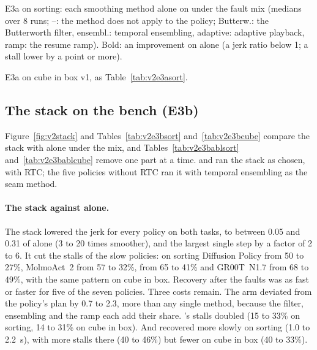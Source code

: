 \begin{table}[htbp]
  \centering
  \small
  \begin{adjustbox}{max width=\textwidth}
  \end{adjustbox}
  \caption{E3a on sorting: each smoothing method alone on \drtc{} under the fault mix (medians over 8 runs; --: the
           method does not apply to the policy; Butterw.: the Butterworth filter, ensembl.: temporal ensembling, adaptive:
           adaptive playback, ramp: the resume ramp). Bold: an improvement on \drtc{} alone (a jerk ratio below 1; a
           stall lower by a point or more).}\label{tab:v2e3asort}
\end{table}

\begin{table}[htbp]
  \centering
  \small
  \begin{adjustbox}{max width=\textwidth}
  \end{adjustbox}
  \caption{E3a on cube in box v1, as Table~\ref{tab:v2e3asort}.}\label{tab:v2e3acube}
\end{table}

\subsection{The stack on the bench (E3b)}\label{sec:v2e3b}

Figure~\ref{fig:v2stack} and Tables~\ref{tab:v2e3bsort} and~\ref{tab:v2e3bcube} compare the stack with \drtc{} alone
under the mix, and
Tables~\ref{tab:v2e3bablsort} and~\ref{tab:v2e3bablcube} remove one part at a time. \smolvla{} and \groot{} ran the
stack as chosen, with RTC; the five policies without RTC ran it with temporal ensembling as the seam method.

\paragraph{The stack against \drtc{} alone.} The stack lowered the jerk for every policy on both tasks, to between
0.05 and 0.31 of \drtc{} alone (3 to 20 times smoother), and the largest single step by a factor of 2 to 6. It cut the
stalls of the slow policies: on sorting Diffusion Policy from 50 to 27\%, MolmoAct~2 from 57 to 32\%, \groot{} from 65
to 41\% and GR00T~N1.7 from 68 to 49\%, with the same pattern on cube in box. Recovery after the faults was as fast or
faster for five of the seven policies. Three costs remain. The arm deviated from the policy's plan by 0.7 to
2.3\degree, more than any single method, because the filter, ensembling and the ramp each add their share. \smolvla's
stalls doubled (15 to 33\% on sorting, 14 to 31\% on cube in box). And \pizerofive{} recovered more slowly on sorting
(1.0 to 2.2~s), with more stalls there (40 to 46\%) but fewer on cube in box (40 to 33\%).

